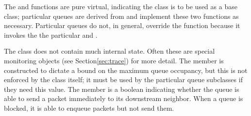 The  and  functions are pure virtual, indicating
the  class is to be used as a base class;
particular queues are derived
from  and implement these two functions as necessary.
Particular queues do not, in general, override the  function
because it invokes the
the particular  and .

The  class does not contain much internal state.
Often these are special monitoring objects (see Section\ref{sec:trace})
for more detail.
The  member is constructed to dictate a bound on the maximum
queue occupancy, but this is not enforced by the  class itself; it
must be used by the particular queue subclasses if they need this value.
The  member is a boolean indicating whether the
queue is able to send a packet immediately to its downstream neighbor.
When a queue is blocked, it is able to enqueue packets but not send them.

\subsubsection{}

